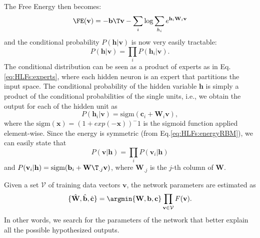 The Free Energy then becomes: 
\begin{equation}
\FE(\mathbf{v})=-\mathbf{b}\T \mathbf{v} -\sum_i \log \sum_{h_i} e^{\mathbf{h}_i \mathbf{W}_i \mathbf{v}}
\end{equation}
and the conditional probability $P(\mathbf{h}|\mathbf{v})$ is now very easily tractable:
\begin{equation}
P(\mathbf{h}|\mathbf{v})=\prod_i P(\mathbf{h}_i|\mathbf{v}).
\end{equation}
The conditional distribution can be seen as a product of experts as in Eq. \ref{eq:HLFs:experts}, where each hidden neuron is an expert that partitions the input space. The conditional probability of the hidden variable $\mathbf{h}$ is simply a product of the conditional probabilities of the single units, i.e., we obtain the output for each of the hidden unit as  
\begin{equation}
P(\mathbf{h}_i|\mathbf{v})= \text{sigm}(\mathbf{c}_i + \mathbf{W}_i \mathbf{v}),
\end{equation}
where the $\text{sigm}(\mathbf{x})=(1+exp(-\mathbf{x}))^-1$ is the sigmoid function applied element-wise. Since the energy is symmetric (from Eq.\ref{eq:HLFs:energyRBM}), we can easily state that 
\begin{equation}
P(\mathbf{v}|\mathbf{h})=\prod_i P(\mathbf{v}_i|\mathbf{h})
\label{eq:LLFs:generatingx}
\end{equation} and $P(\mathbf{v}_i|\mathbf{h})= \text{sigm}(\mathbf{b}_i + \mathbf{W}\T_{.j} \mathbf{v})$, where $\mathbf{W}_{.j}$ is the $j$-th column of $\mathbf{W}$. 

Given a set $\mathcal{V}$ of training data vectors $\mathbf{v}$, the network parameters are estimated as 
\begin{equation}
\{\hat{\mathbf{W}}, \hat{\mathbf{b}}, \hat{\mathbf{c}}\} = \argmin{\mathbf{W}, \mathbf{b}, \mathbf{c}} \prod_{\mathbf{v} \in \mathcal{V}} F(\mathbf{v}).
\label{eq:training}
\end{equation}
In other words, we search for the parameters of the network that better explain all the possible hypothesized outputs.

